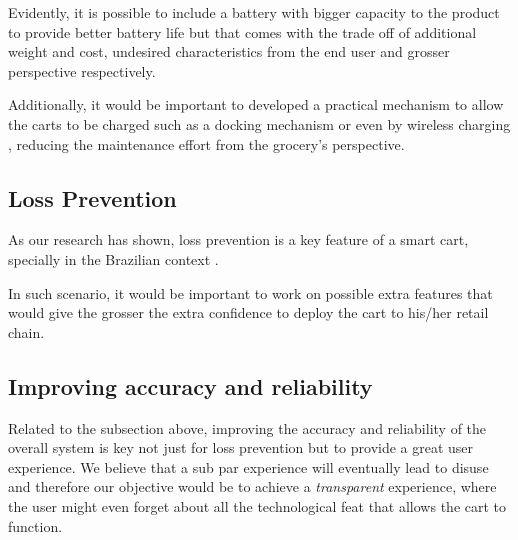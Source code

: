 Evidently, it is possible to include a battery with bigger capacity to the
product to provide better battery life but that comes with the trade off of
additional weight and cost, undesired characteristics from the end user and
grosser perspective respectively.

Additionally, it would be important to developed a practical mechanism to allow
the carts to be charged such as a docking mechanism or even by wireless
charging \cite{Treffers2015}, reducing the maintenance effort from the grocery's
perspective. 

\subsection{Loss Prevention}

As our research has shown, loss prevention is a key feature of a smart cart, specially in the Brazilian context
\cite{Nextop2022}.

In such scenario, it would be important to work on possible extra features that
would give the grosser the extra confidence to deploy the cart to his/her retail
chain.

\subsection{Improving accuracy and reliability}

Related to the subsection above, improving the accuracy and reliability of the
overall system is key not just for loss prevention but to provide a great user
experience. We believe that a sub par experience will eventually lead to disuse
and therefore our objective would be to achieve a \textit{transparent}
experience, where the user might even forget about all the technological feat
that allows the cart to function.
